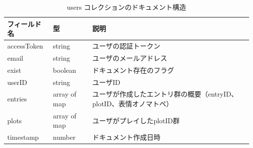 \begin{table}[H]
  \centering  
  \caption{users コレクションのドキュメント構造}                %
  \label{table:user}
  \begin{tabular}{|l|l|p{7cm}|}
    \hline
    \bf フィールド名 & \bf 型 & \bf 説明 \\
    \hline
    accessToken & string & ユーザの認証トークン \\
    email & string & ユーザのメールアドレス \\
    exist & boolean & ドキュメント存在のフラグ \\
    userID & string & ユーザID \\
    entries & array of map & ユーザが作成したエントリ群の概要（entryID、plotID、表情オノマトペ） \\
    plots & array of map & ユーザがプレイしたplotID群 \\
    timestamp & number & ドキュメント作成日時 \\
    \hline
  \end{tabular}
\end{table}
